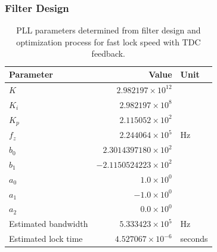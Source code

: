 	\subsubsection{Filter Design}
		\begin{table}[h!]
			\centering
			\def\arraystretch{1.5}		
			\setlength\arrayrulewidth{0.75pt}
			\setlength{\tabcolsep}{1em} %
			\begin{tabular}{|l|r|l|}
				\hline 
				\rule[-1ex]{0pt}{2.5ex} \cellcolor{gray!40}\textbf{Parameter} & \cellcolor{gray!40}\textbf{Value} & \cellcolor{gray!40}\textbf{Unit }\\ 
				\hline 
				\rule[-1ex]{0pt}{2.5ex} \textbf{$K$}  & $2.982197\times10^{12}$ &  \\
				\hline 
				\rule[-1ex]{0pt}{2.5ex} \textbf{$K_i$}  & $2.982197\times10^{8}$ &  \\
				\hline 
				\rule[-1ex]{0pt}{2.5ex} \textbf{$K_p$}  & $2.115052\times10^{2}$ &  \\
				\hline 
				\rule[-1ex]{0pt}{2.5ex} \textbf{$f_z$} & $2.244064\times10^5$ & Hz\\
				\hline 
				\rule[-1ex]{0pt}{2.5ex} \textbf{$b_0$}  & $2.3014397180\times10^2$  &\\
				\hline 
				\rule[-1ex]{0pt}{2.5ex} \textbf{$b_1$}  & $-2.1150524223\times10^2$  & \\
				\hline 
				\rule[-1ex]{0pt}{2.5ex} \textbf{$a_0$}  & $1.0\times10^0$  &\\ 
				\hline 
				\rule[-1ex]{0pt}{2.5ex} \textbf{$a_1$}  & $-1.0\times10^0$  & \\
				\hline 
				\rule[-1ex]{0pt}{2.5ex} \textbf{$a_2$}  & $0.0\times10^0$  & \\
				\hline 
				\rule[-1ex]{0pt}{2.5ex} Estimated bandwidth & $5.333423\times10^5$ & Hz \\
				\hline 
				\rule[-1ex]{0pt}{2.5ex} Estimated lock time & $4.527067\times10^{-6}$ & seconds \\
				\hline 
			\end{tabular} 
			\caption{PLL parameters determined from filter design and optimization process for fast lock speed with TDC feedback.}
			\label{filter_params_fast_lock}
		\end{table}   

